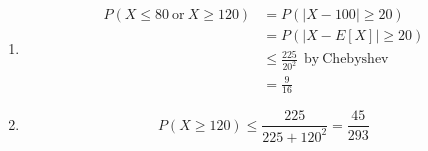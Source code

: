 \begin{problem}{22}$ $
\begin{enumerate}

\item 
\begin{align*}
P(X\le 80 \mathrm{~or~} X \ge 120) &= P(|X-100|\ge 20) \\
& = P(|X-E[X]|\ge 20) \\
& \le \frac{225}{20^2}~~ \mathrm{by~Chebyshev} \\
& = \frac{9}{16}
\end{align*}

\item
\begin{equation*}
P(X \ge 120) \le \frac{225}{225+120^2} =\frac{45}{293}
\end{equation*}

\end{enumerate}

\end{problem}


